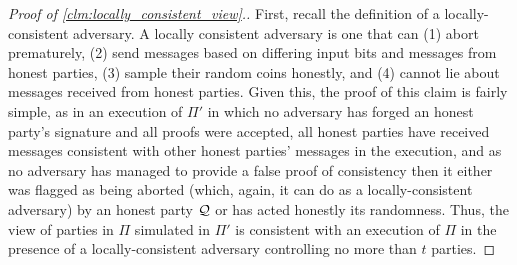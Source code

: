 \begin{proof}[Proof of \cref{clm:locally_consistent_view}.]
	
	First, recall the definition of a locally-consistent adversary. A locally consistent adversary is one that can (1) abort prematurely, (2) send messages based on differing input bits and messages from honest parties, (3) sample their random coins honestly, and (4) cannot lie about messages received from honest parties. Given this, the proof of this claim is fairly simple, as in an execution of $\Pi'$ in which no adversary has forged an honest party's signature and all proofs were accepted, all honest parties have received messages consistent with other honest parties' messages in the execution, and as no adversary has managed to provide a false proof of consistency then it either was flagged as being aborted (which, again, it can do as a locally-consistent adversary) by an honest party $\mathcal{Q}$ or has acted honestly \wrt its randomness. Thus, the view of parties in $\Pi$ simulated in $\Pi'$ is consistent with an execution of $\Pi$ in the presence of a locally-consistent adversary controlling no more than $t$ parties.
\end{proof}
	
